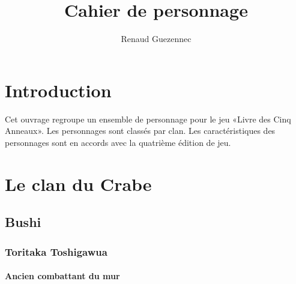 \documentclass[10pt,a4paper]{book}
\author{Renaud Guezennec}
\title{Cahier de personnage}
\date{}
\begin{document}
\maketitle \clearpage
\tableofcontents \clearpage


\chapter{Introduction}

Cet ouvrage regroupe un ensemble de personnage pour le jeu «Livre des Cinq Anneaux». Les personnages sont classés par clan. Les caractéristiques des personnages sont en accords avec la quatrième édition de jeu.

\chapter{Le clan du Crabe}
\section{Bushi}

\subsection{Toritaka Toshigawua}
\subsubsection*{Ancien combattant du mur}
\end{document}
